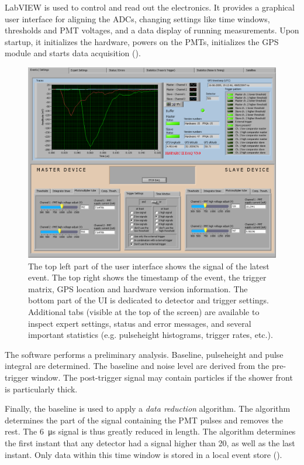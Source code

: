 LabVIEW \cite{labview} is used to control and read out the \hisparc electronics.
It provides a graphical user interface for aligning the ADCs, changing settings
like time windows, thresholds and PMT voltages, and a data display of running
measurements.  Upon startup, it initializes the hardware, powers on the PMTs,
initializes the GPS module and starts data acquisition
().
\begin{figure}
\centering
\includegraphics[width=\linewidth]{figures/Screenshot_daq_501}
\caption{ The top left part
of the user interface shows the signal of the latest event. The top right shows
the timestamp of the event, the trigger matrix, GPS location and hardware
version information. The bottom part of the UI is dedicated to detector and
trigger settings. Additional tabs (visible at the top of the screen) are
available to inspect expert settings, status and error messages, and several
important statistics (e.g. pulseheight histograms, trigger rates, etc.).}
\label{fig:daq-screenshot}
\end{figure}
The \daq software performs a preliminary analysis. Baseline, pulseheight and
pulse integral are determined. The baseline and noise level are derived from the
pre-trigger window. The post-trigger signal may contain particles if the
shower front is particularly thick.

Finally, the baseline is used to apply a \emph{data reduction} algorithm.  The
algorithm determines the part of the signal containing the PMT pulses and
removes the rest.  The \SI{6}{\micro\second} signal is thus greatly reduced in
length.  The algorithm determines the first instant that any detector had a
signal higher than \SI{20}{\adc}, as well as the last instant.  Only data within
this time window is stored in a local event store
().


